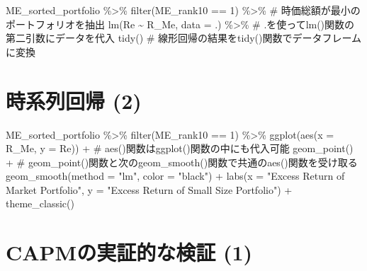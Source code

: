 \documentclass[
  letterpaper,
  DIV=11,
  numbers=noendperiod]{scrreprt}
\newenvironment{Shaded}{\begin{snugshade}}{\end{snugshade}}
\newcommand{\AttributeTok}[1]{\textcolor[rgb]{0.40,0.45,0.13}{#1}}
\newcommand{\CommentTok}[1]{\textcolor[rgb]{0.37,0.37,0.37}{#1}}
\newcommand{\DecValTok}[1]{\textcolor[rgb]{0.68,0.00,0.00}{#1}}
\newcommand{\FunctionTok}[1]{\textcolor[rgb]{0.28,0.35,0.67}{#1}}
\newcommand{\NormalTok}[1]{\textcolor[rgb]{0.00,0.23,0.31}{#1}}
\newcommand{\SpecialCharTok}[1]{\textcolor[rgb]{0.37,0.37,0.37}{#1}}
\newcommand{\StringTok}[1]{\textcolor[rgb]{0.13,0.47,0.30}{#1}}
\begin{document}
\begin{Shaded}
\begin{Highlighting}[]
\NormalTok{ME\_sorted\_portfolio }\SpecialCharTok{\%\textgreater{}\%} 
  \FunctionTok{filter}\NormalTok{(ME\_rank10 }\SpecialCharTok{==} \DecValTok{1}\NormalTok{) }\SpecialCharTok{\%\textgreater{}\%} \CommentTok{\# 時価総額が最小のポートフォリオを抽出}
  \FunctionTok{lm}\NormalTok{(Re }\SpecialCharTok{\textasciitilde{}}\NormalTok{ R\_Me, }\AttributeTok{data =}\NormalTok{ .) }\SpecialCharTok{\%\textgreater{}\%} \CommentTok{\# .を使ってlm()関数の第二引数にデータを代入}
  \FunctionTok{tidy}\NormalTok{() }\CommentTok{\# 線形回帰の結果をtidy()関数でデータフレームに変換}
\end{Highlighting}
\end{Shaded}

\section{時系列回帰 (2)}\label{ux6642ux7cfbux5217ux56deux5e30-2}

\begin{Shaded}
\begin{Highlighting}[]
\NormalTok{ME\_sorted\_portfolio }\SpecialCharTok{\%\textgreater{}\%} 
  \FunctionTok{filter}\NormalTok{(ME\_rank10 }\SpecialCharTok{==} \DecValTok{1}\NormalTok{) }\SpecialCharTok{\%\textgreater{}\%}
  \FunctionTok{ggplot}\NormalTok{(}\FunctionTok{aes}\NormalTok{(}\AttributeTok{x =}\NormalTok{ R\_Me, }\AttributeTok{y =}\NormalTok{ Re)) }\SpecialCharTok{+} \CommentTok{\# aes()関数はggplot()関数の中にも代入可能}
  \FunctionTok{geom\_point}\NormalTok{() }\SpecialCharTok{+}  \CommentTok{\# geom\_point()関数と次のgeom\_smooth()関数で共通のaes()関数を受け取る}
  \FunctionTok{geom\_smooth}\NormalTok{(}\AttributeTok{method =} \StringTok{"lm"}\NormalTok{, }\AttributeTok{color =} \StringTok{"black"}\NormalTok{) }\SpecialCharTok{+}
  \FunctionTok{labs}\NormalTok{(}\AttributeTok{x =} \StringTok{"Excess Return of Market Portfolio"}\NormalTok{, }\AttributeTok{y =} \StringTok{"Excess Return of Small Size Portfolio"}\NormalTok{) }\SpecialCharTok{+} 
  \FunctionTok{theme\_classic}\NormalTok{()}
\end{Highlighting}
\end{Shaded}

\section{CAPMの実証的な検証
(1)}\label{capmux306eux5b9fux8a3cux7684ux306aux691cux8a3c-1}
\end{document}
